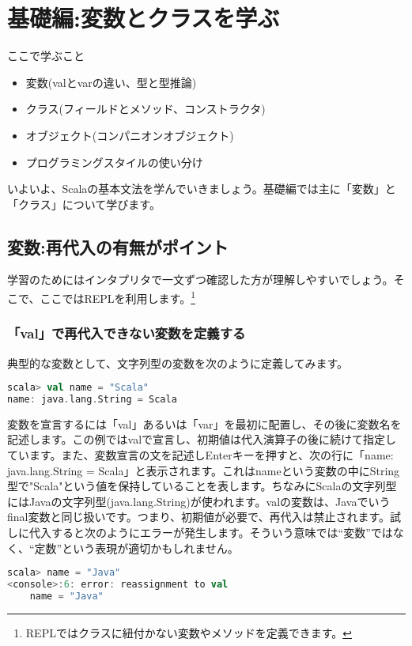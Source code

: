 \section{基礎編:変数とクラスを学ぶ}
\begin{itembox}[l]{ここで学ぶこと}
\begin{itemize}
\item 変数(valとvarの違い、型と型推論)
\item クラス(フィールドとメソッド、コンストラクタ)
\item オブジェクト(コンパニオンオブジェクト)
\item プログラミングスタイルの使い分け
\end{itemize}
\end{itembox}
いよいよ、Scalaの基本文法を学んでいきましょう。基礎編では主に「変数」と「クラス」について学びます。

\subsection{変数:再代入の有無がポイント}
学習のためにはインタプリタで一文ずつ確認した方が理解しやすいでしょう。そこで、ここではREPLを利用します。\footnote{REPLではクラスに紐付かない変数やメソッドを定義できます。}
\subsubsection{「val」で再代入できない変数を定義する}
典型的な変数として、文字列型の変数を次のように定義してみます。

\begin{lstlisting}[language=scala, frame=none]
scala> val name = "Scala"
name: java.lang.String = Scala
\end{lstlisting}

変数を宣言するには「val」あるいは「var」を最初に配置し、その後に変数名を記述します。この例ではvalで宣言し、初期値は代入演算子の後に続けて指定しています。また、変数宣言の文を記述しEnterキーを押すと、次の行に「name: java.lang.String = Scala」と表示されます。これはnameという変数の中にString型で"Scala"という値を保持していることを表します。ちなみにScalaの文字列型にはJavaの文字列型(java.lang.String)が使われます。valの変数は、Javaでいうfinal変数と同じ扱いです。つまり、初期値が必要で、再代入は禁止されます。試しに代入すると次のようにエラーが発生します。そういう意味では“変数”ではなく、“定数”という表現が適切かもしれません。

\begin{lstlisting}[language=scala, frame=none]
scala> name = "Java"
<console>:6: error: reassignment to val
    name = "Java"
\end{lstlisting}

